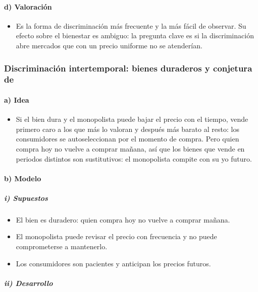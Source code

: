 \documentclass[11pt]{article}
\begin{document}
\paragraph{d) Valoración}

\begin{itemize}
\item Es la forma de discriminación más frecuente y la más fácil de observar. Su efecto sobre el bienestar es ambiguo: la pregunta clave es si la discriminación abre mercados que con un precio uniforme no se atenderían.
\end{itemize}

\subsubsection{Discriminación intertemporal: bienes duraderos y conjetura de }\label{sec:discriminacion-intertemporal-bienes}

\paragraph{a) Idea}

\begin{itemize}
\item Si el bien dura y el monopolista puede bajar el precio con el tiempo, vende primero caro a los que más lo valoran y después más barato al resto: los consumidores se autoseleccionan por el momento de compra. Pero quien compra hoy no vuelve a comprar mañana, así que los bienes que vende en periodos distintos son sustitutivos: el monopolista compite con su yo futuro.
\end{itemize}

\paragraph{b) Modelo}

\subparagraph{i) Supuestos}

\begin{itemize}
\item El bien es duradero: quien compra hoy no vuelve a comprar mañana.
\item El monopolista puede revisar el precio con frecuencia y no puede comprometerse a mantenerlo.
\item Los consumidores son pacientes y anticipan los precios futuros.
\end{itemize}

\subparagraph{ii) Desarrollo}
\end{document}
